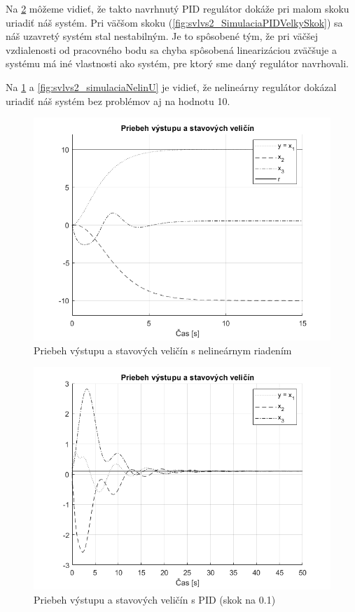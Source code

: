 \documentclass[../main.tex]{subfiles}
\begin{document}
Na \cref{fig:svlvs2_SimulaciaPID} môžeme vidieť, že takto navrhnutý PID regulátor dokáže pri malom skoku uriadiť náš systém. Pri väčšom skoku (\cref{fig:svlvs2_SimulaciaPIDVelkySkok}) sa náš uzavretý systém stal nestabilným. Je to spôsobené tým, že pri väčšej vzdialenosti od pracovného bodu sa chyba spôsobená linearizáciou zväčšuje a systému má iné vlastnosti ako systém, pre ktorý sme daný regulátor navrhovali.

Na \cref{fig:svlvs2_simulaciaNelin} a \cref{fig:svlvs2_simulaciaNelinU} je vidieť, že nelineárny regulátor dokázal uriadiť náš systém bez problémov aj na hodnotu 10.
	\begin{figure}[h!]
		\centering
		\includegraphics[width=0.8\linewidth]{SimulaciaNelin}
		\caption{Priebeh výstupu a stavových veličín s nelineárnym riadením}
		\label{fig:svlvs2_simulaciaNelin}
	\end{figure}

	\begin{figure}[h!]
		\centering
		\includegraphics[width=0.8\linewidth]{SimulaciaPID}
		\caption{Priebeh výstupu a stavových veličín s PID (skok na 0.1)}
		\label{fig:svlvs2_SimulaciaPID}
	\end{figure}
\end{document}
